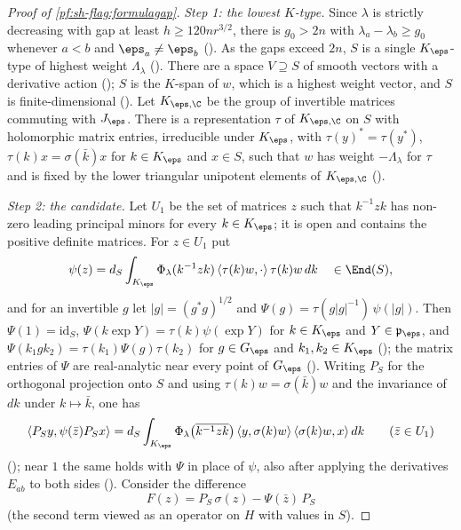 \begin{proof}[Proof of \cref{pf:sh-flag:formulagap}]
\emph{Step 1: the lowest $K$-type.} Since $\lambda$ is strictly decreasing with gap at least $h\ge120nr^{3/2}$, there is
$g_0>2n$ with $\lambda_a-\lambda_b\ge g_0$ whenever $a<b$ and $\eps_a\ne\eps_b$
(). As the gaps exceed $2n$, $S$ is a single $K_\eps$-type of highest
weight $\Lambda_\lambda$ (). There are a space $V\supseteq S$ of smooth
vectors with a derivative action (); $S$ is the $K$-span of $w$, which
is a highest weight vector, and $S$ is finite-dimensional (). Let
$K_{\eps,\C}$ be the group of invertible matrices commuting with $J_\eps$. There is a representation $\tau$ of $K_{\eps,\C}$ on
$S$ with holomorphic matrix entries, irreducible under $K_\eps$, with $\tau(y)^*=\tau(y^*)$, $\tau(k)x=\sigma(\bar k)x$ for
$k\in K_\eps$ and $x\in S$, such that $w$ has weight $-\Lambda_\lambda$ for $\tau$ and is fixed by the lower triangular unipotent
elements of $K_{\eps,\C}$ ().

\emph{Step 2: the candidate.} Let $U_1$ be the set of matrices $z$ such that $k^{-1}zk$ has non-zero leading principal
minors for every $k\in K_\eps$; it is open and contains the positive definite matrices. For $z\in U_1$ put
\[
\psi(z)=d_S\int_{K_\eps}\Phi_\lambda(k^{-1}zk)\,\langle\tau(k)w,\cdot\rangle\,\tau(k)w\,dk\quad\in\End(S),
\]
and for an invertible $g$ let $|g|=(g^*g)^{1/2}$ and $\Psi(g)=\tau(g|g|^{-1})\,\psi(|g|)$. Then $\Psi(1)=\mathrm{id}_S$,
$\Psi(k\exp Y)=\tau(k)\psi(\exp Y)$ for $k\in K_\eps$ and $Y\in\mathfrak p_\eps$, and $\Psi(k_1gk_2)=\tau(k_1)\Psi(g)\tau(k_2)$ for
$g\in G_\eps$ and $k_1,k_2\in K_\eps$ (); the matrix entries of $\Psi$ are real-analytic
near every point of $G_\eps$ (). Writing $P_S$ for the orthogonal projection onto
$S$ and using $\tau(k)w=\sigma(\bar k)w$ and the invariance of $dk$ under $k\mapsto\bar k$, one has
\begin{equation}\label{pf:sh-flag:eq:psi}
\langle P_Sy,\psi(\bar z)P_Sx\rangle=d_S\int_{K_\eps}\Phi_\lambda\bigl(\overline{k^{-1}zk}\bigr)\,\langle y,\sigma(k)w\rangle\,
\langle\sigma(k)w,x\rangle\,dk\qquad(\bar z\in U_1)
\end{equation}
(); near $1$ the same holds with $\Psi$ in place of $\psi$, also after
applying the derivatives $E_{ab}$ to both sides (). Consider the difference
\[
F(z)=P_S\,\sigma(z)-\Psi(\bar z)\,P_S
\]
(the second term viewed as an operator on $H$ with values in $S$).


\end{proof}
